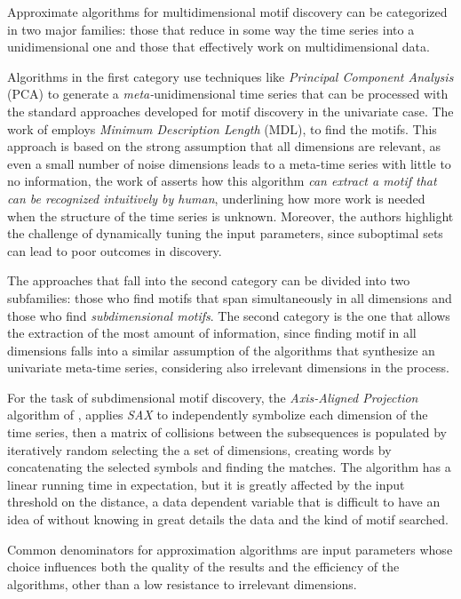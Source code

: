 Approximate algorithms for multidimensional motif discovery can be categorized in two major families: those that reduce in some way the time series into a unidimensional one and those that effectively work on multidimensional data.

Algorithms in the first category use techniques like \textit{Principal Component Analysis} (PCA) to generate a \textit{meta-}unidimensional time series that can be processed with the standard approaches developed for motif discovery in the univariate case. The work of \cite{tanaka2005discovery} employs \textit{Minimum Description Length} (MDL), to find the motifs. This approach is based on the strong assumption that all dimensions are relevant, as even a small number of noise dimensions leads to a meta-time series with little to no information, the  work of \cite{tanaka2005discovery} asserts how this algorithm \textit{can extract
a motif that can be recognized intuitively by human}, underlining how more work is needed when the structure of the time series is unknown. Moreover, the authors highlight the challenge of dynamically tuning the input parameters, since suboptimal sets can lead to poor outcomes in discovery.

The approaches that fall into the second category can be divided into two subfamilies: those who find motifs that span simultaneously in all dimensions \cite{berlin2012detecting} and those who find \textit{subdimensional motifs}. The second category is the one that allows the extraction of the most amount of information, since finding motif in all dimensions falls into a similar assumption of the algorithms that synthesize an univariate meta-time series, considering also irrelevant dimensions in the process.

For the task of subdimensional motif discovery, the \textit{Axis-Aligned Projection} algorithm of \cite{4470297}, applies \textit{SAX} to independently symbolize each dimension of the time series, then a matrix of collisions between the subsequences is populated by iteratively random selecting the a set of dimensions, creating words by concatenating the selected symbols and finding the matches. The algorithm has a linear running time in expectation, but it is greatly affected by the input threshold on the distance, a data dependent variable that is difficult to have an idea of without knowing in great details the data and the kind of motif searched.

Common denominators for approximation algorithms are input parameters whose choice influences both the quality of the results and the efficiency of the algorithms, other than a low resistance to irrelevant dimensions.

